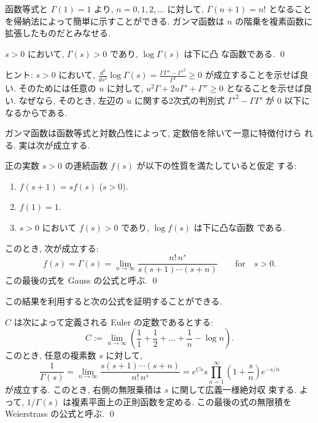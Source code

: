 \documentclass[12pt,twoside]{jarticle}
\begin{document}
\noindent 函数等式と $\Gamma(1)=1$ より, $n=0,1,2,\dots$ に対して,
$\Gamma(n+1) = n!$ となることを帰納法によって簡単に示すことができる. 
ガンマ函数は $n$ の階乗を複素函数に拡張したものだとみなせる.

\begin{question}[対数凸性]
  $s > 0$ において, $\Gamma(s) > 0$ であり, $\log \Gamma(s)$ は下に凸
  な函数である.
  \qed
\end{question}

\noindent ヒント: $s > 0$ において, %
\(
  \frac{d^2}{ds^2}\log\Gamma(s)
  = \frac{\Gamma\Gamma'' - {\Gamma'}^2}{\Gamma^2}
  \ge 0
\)%
が成立することを示せば良い. そのためには任意の $u$ に対して,
$u^2\Gamma+2u\Gamma'+\Gamma''\ge0$ となることを示せば良い. なぜなら, 
そのとき, 左辺の $u$ に関する$2$次式の判別式 %
${\Gamma'}^2 - \Gamma\Gamma'$ が $0$ 以下になるからである.

ガンマ函数は函数等式と対数凸性によって, 定数倍を除いて一意に特徴付けら
れる. 実は次が成立する.

\begin{question}
  正の実数 $s > 0$ の連続函数 $f(s)$ が以下の性質を満たしていると仮定
  する:
  \begin{enumerate}
  \item $f(s+1) = s f(s)$ \quad ($s > 0$).
  \item $f(1) = 1$.
  \item $s > 0$ において $f(s) > 0$ であり, $\log f(s)$ は下に凸な函数
    である.
  \end{enumerate}
  このとき, 次が成立する:
  \[
    f(s)
    = \Gamma(s)
    = \lim_{n\to\infty} \frac{n!\,n^s}{s(s+1)\cdots(s+n)}
    \qquad\text{for}\quad s > 0.
  \]
  この最後の式を Gauss の公式と呼ぶ.
  \qed
\end{question}

\noindent この結果を利用すると次の公式を証明することができる.

\begin{question}
  $C$ は次によって定義される Euler の定数であるとする:
  \[
    C :=
    \lim_{n\to\infty}
    \left( \frac{1}{1} + \frac{1}{2} + \dots + \frac{1}{n} - \log n\right).
  \]%
  このとき, 任意の複素数 $s$ に対して,
  \[
    \frac{1}{\Gamma(s)}
    =
    \lim_{n\to\infty}
    \frac{s(s+1)\cdots(s+n)}{n!\,n^s}
    =
    e^{Cs} s \prod_{n=1}^{\infty}\left( 1 + \frac{s}{n} \right) e^{-s/n}
  \]%
  が成立する. このとき, 右側の無限乗積は $s$ に関して広義一様絶対収
  束する. よって, $1/\Gamma(s)$ は複素平面上の正則函数を定める. 
  この最後の式の無限積を Weierstrass の公式と呼ぶ.
  \qed
\end{question}
\end{document}
